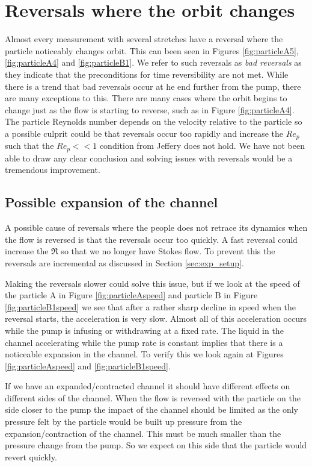 \section{Reversals where the orbit changes}
Almost every measurement with several stretches have a reversal where the particle noticeably changes orbit. This can been seen in Figures \ref{fig:particleA5}, \ref{fig:particleA4} and \ref{fig:particleB1}. We refer to such reversals as \emph{bad reversals} as they indicate that the preconditions for time reversibility are not met. While there is a trend that bad reversals occur at he end further from the pump, there are many exceptions to this. There are many cases where the orbit begins to change just as the flow is starting to reverse, such as in Figure \ref{fig:particleA4}. The particle Reynolds number depends on the velocity relative to the particle so a possible culprit could be that reversals occur too rapidly and increase the $Re_p$ such that the $Re_p << 1$ condition from Jeffery \cite{Jeffery} does not hold. We have not been able to draw any clear conclusion and solving issues with reversals would be a tremendous improvement.


\subsection{Possible expansion of the channel}
A possible cause of reversals where the people does not retrace its dynamics when the flow is reversed is that the reversals occur too quickly. A fast reversal could increase the $\Re$ so that we no longer have Stokes flow. To prevent this the reversals are incremental as discussed in Section \ref{sec:exp_setup}. 

Making the reversals slower could solve this issue, but if we look at the speed of the particle A in Figure \ref{fig:particleAspeed} and particle B in Figure \ref{fig:particleB1speed} we see that after a rather 
sharp decline in speed when the reversal starts, the acceleration is very slow. Almost all of this acceleration occurs while the pump is 
infusing or withdrawing at a fixed rate. The liquid in the channel accelerating while the pump rate is constant implies that there 
is a noticeable expansion in the channel. To verify this we look again at Figures
\ref{fig:particleAspeed} and \ref{fig:particleB1speed}.

If we have an expanded/contracted channel it should have different effects on different sides of the channel. When the flow is reversed with the particle on the side closer to the pump the impact of the channel should be limited as the only pressure felt by the particle would be built up pressure from the expansion/contraction of the channel. This must be much smaller than the pressure change from the pump. So we expect on this side that the particle would revert quickly.


